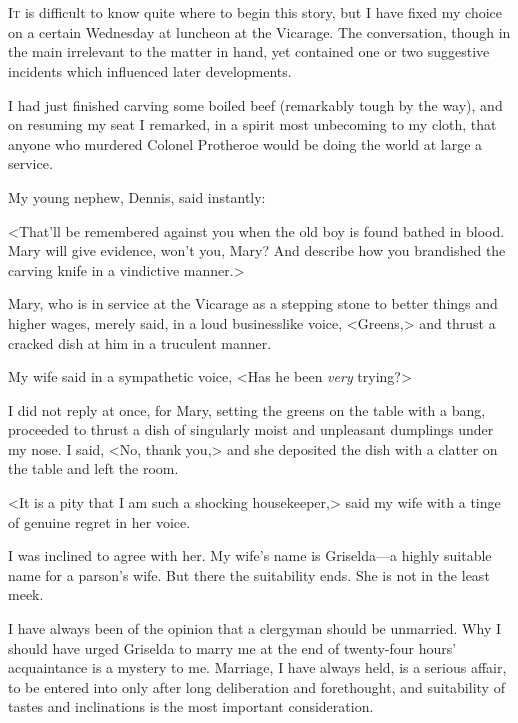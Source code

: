 \chapter[Chapter  \thechapter]{}


\lettrine{I}{t} is difficult to know quite where to begin this story, but I have fixed my choice on a certain Wednesday at luncheon at the Vicarage. The conversation, though in the main irrelevant to the matter in hand, yet contained one or two suggestive incidents which influenced later developments.

I had just finished carving some boiled beef (remarkably tough by the way), and on resuming my seat I remarked, in a spirit most unbecoming to my cloth, that anyone who murdered Colonel Protheroe would be doing the world at large a service.

My young nephew, Dennis, said instantly:

<That'll be remembered against you when the old boy is found bathed in blood. Mary will give evidence, won't you, Mary? And describe how you brandished the carving knife in a vindictive manner.>

Mary, who is in service at the Vicarage as a stepping stone to better things and higher wages, merely said, in a loud businesslike voice, <Greens,> and thrust a cracked dish at him in a truculent manner.

My wife said in a sympathetic voice, <Has he been \emph{very} trying?>

I did not reply at once, for Mary, setting the greens on the table with a bang, proceeded to thrust a dish of singularly moist and unpleasant dumplings under my nose. I said, <No, thank you,> and she deposited the dish with a clatter on the table and left the room.

<It is a pity that I am such a shocking housekeeper,> said my wife with a tinge of genuine regret in her voice.

I was inclined to agree with her. My wife's name is Griselda—a highly suitable name for a parson's wife. But there the suitability ends. She is not in the least meek.

I have always been of the opinion that a clergyman should be unmarried. Why I should have urged Griselda to marry me at the end of twenty-four hours' acquaintance is a mystery to me. Marriage, I have always held, is a serious affair, to be entered into only after long deliberation and forethought, and suitability of tastes and inclinations is the most important consideration.

